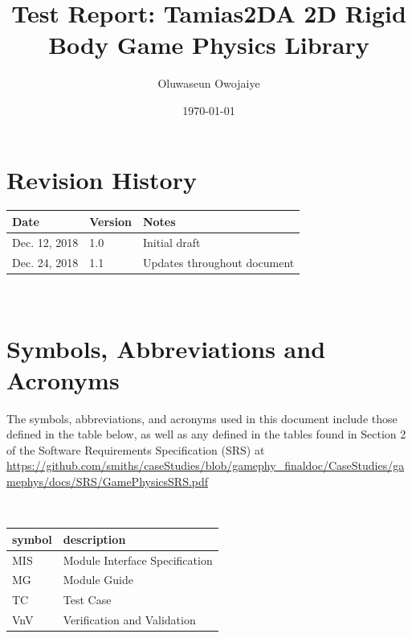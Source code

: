 \documentclass[12pt, titlepage]{article}
\newcommand{\progname}{Tamias2D}
\begin{document}
\title{Test Report: \progname A 2D Rigid Body Game Physics Library} 
\author{Oluwaseun Owojaiye}
\date{\today}
	
\maketitle


\section{Revision History}

\begin{tabularx}{\textwidth}{p{3cm}p{2cm}X}
\toprule {\bf Date} & {\bf Version} & {\bf Notes}\\
\midrule
Dec. 12, 2018 & 1.0 & Initial draft\\
Dec. 24, 2018 & 1.1 & Updates throughout document\\
\bottomrule
\end{tabularx}

~\newpage

\section{Symbols, Abbreviations and Acronyms}


The symbols, abbreviations, and acronyms used in this document include those defined in the table below, as well as any defined in the tables found in Section 2 of the Software Requirements Specification (SRS) at
\url {https://github.com/smiths/caseStudies/blob/gamephy_finaldoc/CaseStudies/gamephys/docs/SRS/GamePhysicsSRS.pdf}

~\newline
\renewcommand{\arraystretch}{1.2}

\begin{tabular}{l l} 
	
	\toprule		
	
	\textbf{symbol} & \textbf{description}\\
	
	\midrule
	
	MIS & Module Interface Specification\\
	
	MG & Module Guide\\
	
	TC & Test Case\\
	
	VnV & Verification and Validation\\
	
	\bottomrule
	
\end{tabular}\\
\newpage
\end{document}
